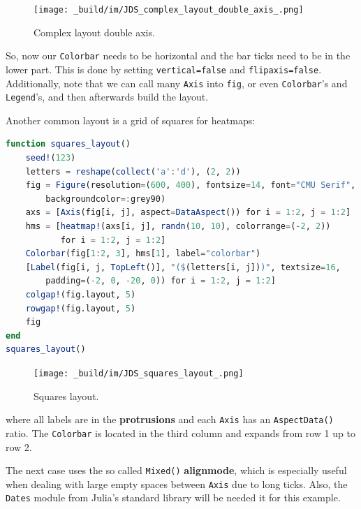 \documentclass[
  notoc %
]{tufte-book}
\newcommand{\passthrough}[1]{#1}
\begin{document}
\begin{figure}
\hypertarget{fig:complex_layout_double_axis}{%
\centering
\texttt{[image: \_build/im/JDS\_complex\_layout\_double\_axis\_.png]}
\caption{Complex layout double
axis.}\label{fig:complex_layout_double_axis}
}
\end{figure}

So, now our \passthrough{\lstinline!Colorbar!} needs to be horizontal
and the bar ticks need to be in the lower part. This is done by setting
\passthrough{\lstinline!vertical=false!} and
\passthrough{\lstinline!flipaxis=false!}. Additionally, note that we can
call many \passthrough{\lstinline!Axis!} into
\passthrough{\lstinline!fig!}, or even
\passthrough{\lstinline!Colorbar!}'s and
\passthrough{\lstinline!Legend!}'s, and then afterwards build the
layout.

Another common layout is a grid of squares for heatmaps:

\begin{lstlisting}[language=Julia]
function squares_layout()
    seed!(123)
    letters = reshape(collect('a':'d'), (2, 2))
    fig = Figure(resolution=(600, 400), fontsize=14, font="CMU Serif",
        backgroundcolor=:grey90)
    axs = [Axis(fig[i, j], aspect=DataAspect()) for i = 1:2, j = 1:2]
    hms = [heatmap!(axs[i, j], randn(10, 10), colorrange=(-2, 2))
           for i = 1:2, j = 1:2]
    Colorbar(fig[1:2, 3], hms[1], label="colorbar")
    [Label(fig[i, j, TopLeft()], "($(letters[i, j]))", textsize=16,
        padding=(-2, 0, -20, 0)) for i = 1:2, j = 1:2]
    colgap!(fig.layout, 5)
    rowgap!(fig.layout, 5)
    fig
end
squares_layout()
\end{lstlisting}

\begin{figure}
\hypertarget{fig:squares_layout}{%
\centering
\texttt{[image: \_build/im/JDS\_squares\_layout\_.png]}
\caption{Squares layout.}\label{fig:squares_layout}
}
\end{figure}

where all labels are in the \textbf{protrusions} and each
\passthrough{\lstinline!Axis!} has an
\passthrough{\lstinline!AspectData()!} ratio. The
\passthrough{\lstinline!Colorbar!} is located in the third column and
expands from row 1 up to row 2.

The next case uses the so called \passthrough{\lstinline!Mixed()!}
\textbf{alignmode}, which is especially useful when dealing with large
empty spaces between \passthrough{\lstinline!Axis!} due to long ticks.
Also, the \passthrough{\lstinline!Dates!} module from Julia's standard
library will be needed it for this example.
\end{document}
